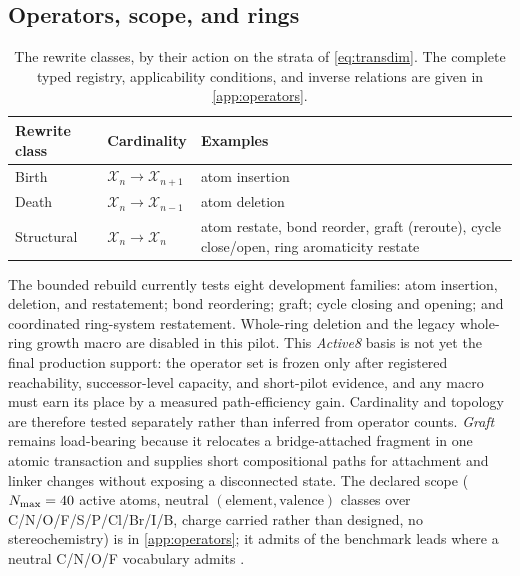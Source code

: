 \documentclass{article}
\newcommand{\X}{\mathcal{X}}
\theoremstyle{definition}
\theoremstyle{remark}
\begin{document}
\subsection{Operators, scope, and rings}
\label{sec:operators}

\begin{table}[tb]
\centering
\caption{The rewrite classes, by their action on the strata of \eqref{eq:transdim}. The complete typed registry, applicability conditions, and inverse relations are given in \cref{app:operators}.}
\label{tab:operators}
\small
\begin{tabularx}{\textwidth}{@{}llY@{}}
\toprule
Rewrite class & Cardinality & Examples\\
\midrule
Birth & $\X_n\to\X_{n+1}$ & atom insertion\\
Death & $\X_n\to\X_{n-1}$ & atom deletion\\
Structural & $\X_n\to\X_n$ & atom restate, bond reorder, graft (reroute), cycle close/open, ring aromaticity restate\\
\bottomrule
\end{tabularx}
\end{table}

The bounded rebuild currently tests eight development families: atom insertion, deletion, and restatement; bond reordering; graft; cycle closing and opening; and coordinated ring-system restatement. Whole-ring deletion and the legacy whole-ring growth macro are disabled in this pilot. This \emph{Active8} basis is not yet the final production support: the operator set is frozen only after registered reachability, successor-level capacity, and short-pilot evidence, and any macro must earn its place by a measured path-efficiency gain. Cardinality and topology are therefore tested separately rather than inferred from operator counts. \emph{Graft} remains load-bearing because it relocates a bridge-attached fragment in one atomic transaction and supplies short compositional paths for attachment and linker changes without exposing a disconnected state. The declared scope ($N_{\max}=40{}$ active atoms, \ScopeClasses{} neutral $(\text{element},\text{valence})$ classes over C/N/O/F/S/P/Cl/Br/I/B, charge carried rather than designed, no stereochemistry) is in \cref{app:operators}; it admits \LeadCoverageBroad{} of the benchmark leads where a neutral C/N/O/F vocabulary admits \LeadCoverageCnof{}.
\end{document}
